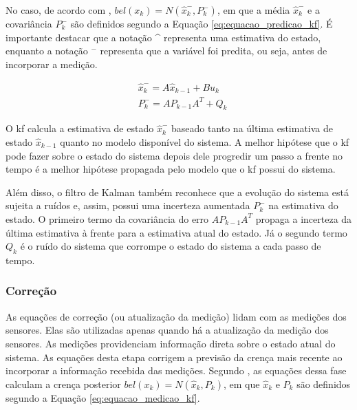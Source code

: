 \documentclass[acronym, symbols, table, deposito]{fei}
\begin{document}
				No caso, de acordo com \textcite{thrun2002probabilistic}, $bel(x_k) = N(\hat{x}_{k}^{-},P_{k}^{-})$, em que a média $\hat{x}_{k}^{-}$ e a covariância $P_{k}^{-}$ são definidos segundo a Equação \eqref{eq:equacao_predicao_kf}. É importante destacar que a notação \^{} representa uma estimativa do estado, enquanto a notação $^-$ representa que a variável foi predita, ou seja, antes de incorporar a medição.
				
				\begin{equation} \label{eq:equacao_predicao_kf}
					\begin{split}
						&\hat{x}_{k}^{-} = A\hat{x}_{k-1} + Bu_{k} \\
						&P_{k}^{-} = AP_{k-1}A^{T} + Q_{k}					
					\end{split}
				\end{equation}
			
				O \acrshort{kf} calcula a estimativa de estado $\hat{x}_{k}^{-}$ baseado tanto na última estimativa de estado $\hat{x}_{k-1}$ quanto no modelo disponível do sistema. A melhor hipótese que o \acrshort{kf} pode fazer sobre o estado do sistema depois dele progredir um passo a frente no tempo é a melhor hipótese propagada pelo modelo que o \acrshort{kf} possui do sistema.
				
				Além disso, o filtro de Kalman também reconhece que a evolução do sistema está sujeita a ruídos e, assim, possui uma incerteza aumentada $P_{k}^{-}$ na estimativa do estado. O primeiro termo da covariância do erro $AP_{k-1}A^{T}$ propaga a incerteza da última estimativa à frente para a estimativa atual do estado. Já o segundo termo $Q_{k}$ é o ruído do sistema que corrompe o estado do sistema a cada passo de tempo.
			
			\subsubsection{Correção}
			
				As equações de correção (ou atualização da medição) lidam com as medições dos sensores. Elas são utilizadas apenas quando há a atualização da medição dos sensores. As medições providenciam informação direta sobre o estado atual do sistema. As equações desta etapa corrigem a previsão da crença mais recente ao incorporar a informação recebida das medições. Segundo \textcite{thrun2002probabilistic}, as equações dessa fase calculam a crença posterior $bel(x_k) = N(\hat{x}_{k},P_{k})$, em que $\hat{x}_{k}$ e $P_{k}$ são definidos segundo a Equação \eqref{eq:equacao_medicao_kf}.
				
\end{document}
